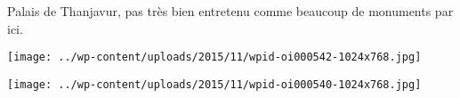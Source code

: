  Palais de Thanjavur, pas très bien entretenu comme beaucoup de monuments par ici. 
\begin{center} \texttt{[image: ../wp-content/uploads/2015/11/wpid-oi000542-1024x768.jpg]} \end{center}
\begin{center} \texttt{[image: ../wp-content/uploads/2015/11/wpid-oi000540-1024x768.jpg]} \end{center}